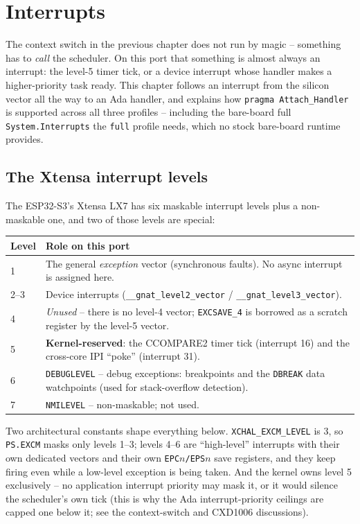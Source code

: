 \chapter{Interrupts}
\label{ch:interrupts}

The context switch in the previous chapter does not run by magic -- something
has to \emph{call} the scheduler. On this port that something is almost always an
interrupt: the level-5 timer tick, or a device interrupt whose handler makes a
higher-priority task ready. This chapter follows an interrupt from the silicon
vector all the way to an Ada handler, and explains how \texttt{pragma
Attach\_Handler} is supported across all three profiles -- including the
bare-board full \texttt{System.Interrupts} the \texttt{full} profile needs,
which no stock bare-board runtime provides.

\section{The Xtensa interrupt levels}

The ESP32-S3's Xtensa LX7 has six maskable interrupt levels plus a non-maskable
one, and two of those levels are special:

\begin{longtable}{p{2.2cm} p{10.5cm}}
\toprule
\textbf{Level} & \textbf{Role on this port} \\ \midrule
\endhead
1     & The general \emph{exception} vector (synchronous faults). No async
        interrupt is assigned here. \\
2--3  & Device interrupts (\texttt{\_\_gnat\_level2\_vector} /
        \texttt{\_\_gnat\_level3\_vector}). \\
4     & \emph{Unused} -- there is no level-4 vector; \texttt{EXCSAVE\_4} is
        borrowed as a scratch register by the level-5 vector. \\
5     & \textbf{Kernel-reserved}: the CCOMPARE2 timer tick (interrupt 16) and the
        cross-core IPI ``poke'' (interrupt 31). \\
6     & \texttt{DEBUGLEVEL} -- debug exceptions: breakpoints and the
        \texttt{DBREAK} data watchpoints (used for stack-overflow detection). \\
7     & \texttt{NMILEVEL} -- non-maskable; not used. \\
\bottomrule
\end{longtable}

Two architectural constants shape everything below. \texttt{XCHAL\_EXCM\_LEVEL}
is 3, so \texttt{PS.EXCM} masks only levels 1--3; levels 4--6 are ``high-level''
interrupts with their own dedicated vectors and their own \texttt{EPC$n$/EPS$n$}
save registers, and they keep firing even while a low-level exception is being
taken. And the kernel owns level 5 exclusively -- no application interrupt
priority may mask it, or it would silence the scheduler's own tick (this is why
the Ada interrupt-priority ceilings are capped one below it; see the context-switch
and CXD1006 discussions).

